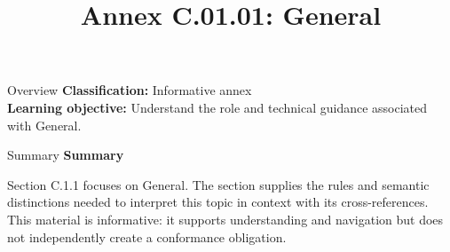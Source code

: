 \documentclass[10pt,letterpaper]{article}
\title{Annex C.01.01: General}
\author{}
\date{}
\begin{document}
\maketitle
\begin{CornellOverviewBox}{Overview}
\textbf{Classification:} Informative annex\\[2pt]
\textbf{Learning objective:} Understand the role and technical guidance associated with General.
\end{CornellOverviewBox}\begin{CornellSummaryBox}{Summary}
{\sffamily\bfseries\color{Accent} Summary}\par\vspace{3pt}Section C.1.1 focuses on General. The section supplies the rules and semantic distinctions needed to interpret this topic in context with its cross-references. This material is informative: it supports understanding and navigation but does not independently create a conformance obligation.
\end{CornellSummaryBox}
\end{document}
